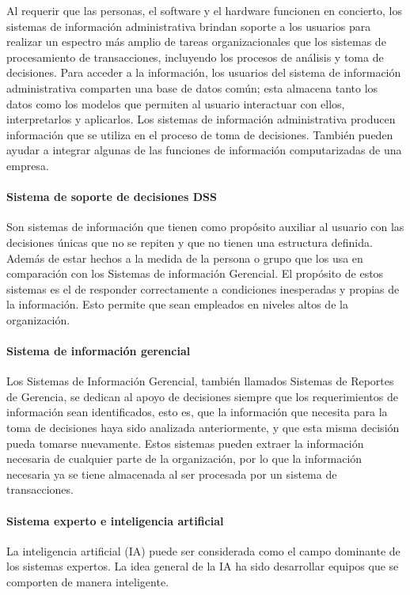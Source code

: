 Al requerir que las personas, el software y el hardware funcionen en concierto, los sistemas de información administrativa brindan soporte a los usuarios para realizar un espectro más amplio de tareas organizacionales que los sistemas de procesamiento de transacciones, incluyendo los procesos de análisis y toma de decisiones. Para acceder a la información, los usuarios del sistema de información administrativa comparten una base de datos común; esta almacena tanto los datos como los modelos que permiten al usuario interactuar con ellos, interpretarlos y aplicarlos. Los sistemas de información administrativa producen información que se utiliza en el proceso de toma de decisiones. También pueden ayudar a integrar algunas de las funciones de información computarizadas de una empresa. 

\paragraph{Sistema de soporte de decisiones DSS}

Son sistemas de información que tienen como propósito auxiliar al usuario con las decisiones únicas que no se repiten y que no tienen una estructura definida\cite{kendall2005analisis}. Además de estar hechos a la medida de la persona o grupo que los usa en comparación con los Sistemas de información Gerencial. El propósito de estos sistemas es el de responder correctamente a condiciones inesperadas y propias de la información. Esto permite que sean empleados en niveles altos de la organización.  

\paragraph{Sistema de información gerencial}

Los Sistemas de Información Gerencial, también llamados Sistemas de Reportes de Gerencia, se dedican al apoyo de decisiones siempre que los requerimientos de información sean identificados, esto es, que la información que necesita para la toma de decisiones haya sido analizada anteriormente, y que esta misma decisión pueda tomarse nuevamente\cite{kendall2005analisis}. Estos sistemas pueden extraer la información necesaria de cualquier parte de la organización, por lo que la información necesaria ya se tiene almacenada al ser procesada por un sistema de transacciones. 


\paragraph{Sistema experto e inteligencia artificial }
La inteligencia artificial (IA) puede ser considerada como el campo dominante de los sistemas expertos. La idea general de la IA ha sido desarrollar equipos que se comporten de manera inteligente\cite{kendall2005analisis}. 

